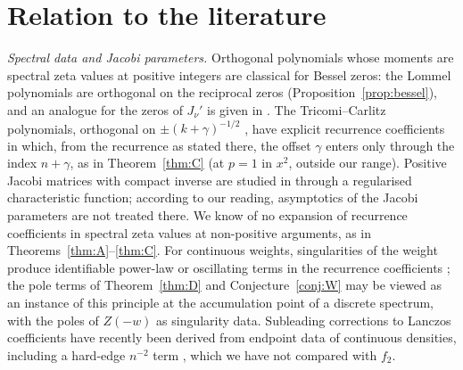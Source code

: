 \section{Relation to the literature}\label{sec:literature}

\emph{Spectral data and Jacobi parameters.} Orthogonal polynomials whose moments are spectral zeta values at positive integers are classical for
Bessel zeros: the Lommel polynomials are orthogonal on the reciprocal zeros \cite{VA} (Proposition~\ref{prop:bessel}), and an analogue for the
zeros of $J_\nu'$ is given in \cite{ChungLeePark}. The Tricomi--Carlitz polynomials, orthogonal on $\pm(k+\gamma)^{-1/2}$ \cite{WuLinXuZhao}, have
explicit recurrence coefficients in which, from the recurrence as stated there, the offset $\gamma$ enters only through the index $n+\gamma$, as in
Theorem~\ref{thm:C} (at $p=1$ in $x^2$, outside our range). Positive Jacobi matrices with compact inverse are studied in
\cite{StovicekSwiderski} through a regularised characteristic function; according to our reading, asymptotics of the Jacobi parameters are
not treated there. We know of no expansion of recurrence coefficients in spectral zeta values at non-positive arguments, as in
Theorems~\ref{thm:A}--\ref{thm:C}. For continuous weights, singularities of the weight produce identifiable power-law or oscillating terms in
the recurrence coefficients \cite{Magnus,FoulquieMoreno}; the pole terms of Theorem~\ref{thm:D} and Conjecture~\ref{conj:W} may be viewed as an
instance of this principle at the accumulation point of a discrete spectrum, with the poles of $Z(-w)$ as singularity data. Subleading
corrections to Lanczos coefficients have recently been derived from endpoint data of continuous densities, including a hard-edge $n^{-2}$
term \cite{MuruganVanZylWatanabe}, which we have not compared with $f_2$.

